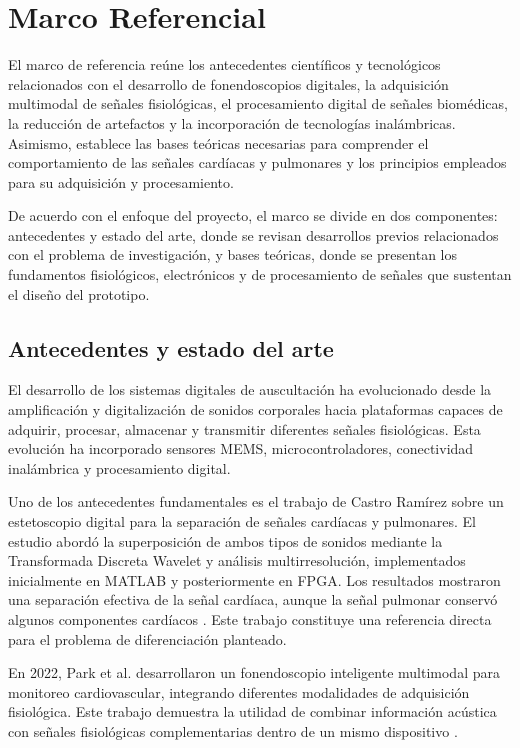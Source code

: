 \chapter{Marco Referencial}\label{MarcoRef}

El marco de referencia reúne los antecedentes científicos y tecnológicos relacionados con el desarrollo de fonendoscopios digitales, la adquisición multimodal de señales fisiológicas, el procesamiento digital de señales biomédicas, la reducción de artefactos y la incorporación de tecnologías inalámbricas. Asimismo, establece las bases teóricas necesarias para comprender el comportamiento de las señales cardíacas y pulmonares y los principios empleados para su adquisición y procesamiento.

De acuerdo con el enfoque del proyecto, el marco se divide en dos componentes: antecedentes y estado del arte, donde se revisan desarrollos previos relacionados con el problema de investigación, y bases teóricas, donde se presentan los fundamentos fisiológicos, electrónicos y de procesamiento de señales que sustentan el diseño del prototipo.

\section{Antecedentes y estado del arte}

El desarrollo de los sistemas digitales de auscultación ha evolucionado desde la amplificación y digitalización de sonidos corporales hacia plataformas capaces de adquirir, procesar, almacenar y transmitir diferentes señales fisiológicas. Esta evolución ha incorporado sensores MEMS, microcontroladores, conectividad inalámbrica y procesamiento digital.

Uno de los antecedentes fundamentales es el trabajo de Castro Ramírez sobre un estetoscopio digital para la separación de señales cardíacas y pulmonares. El estudio abordó la superposición de ambos tipos de sonidos mediante la Transformada Discreta Wavelet y análisis multirresolución, implementados inicialmente en MATLAB y posteriormente en FPGA. Los resultados mostraron una separación efectiva de la señal cardíaca, aunque la señal pulmonar conservó algunos componentes cardíacos . Este trabajo constituye una referencia directa para el problema de diferenciación planteado.

En 2022, Park et al. desarrollaron un fonendoscopio inteligente multimodal para monitoreo cardiovascular, integrando diferentes modalidades de adquisición fisiológica. Este trabajo demuestra la utilidad de combinar información acústica con señales fisiológicas complementarias dentro de un mismo dispositivo .

